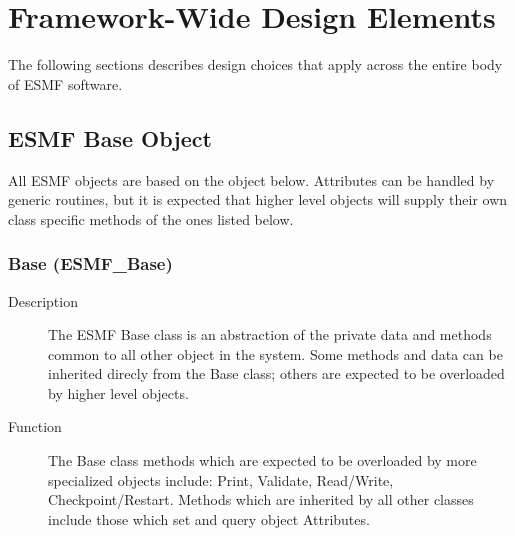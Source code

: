 \section{Framework-Wide Design Elements}
\label{sec:fwdesign}

The following sections describes design choices that apply across the 
entire body of ESMF software.

\subsection{ESMF Base Object}

All ESMF objects are based on the object below.  Attributes
can be handled by generic routines, but it is expected that 
higher level objects will supply their own class specific
methods of the ones listed below.


\subsubsection{Base (ESMF\_Base)}
\label{sec:Base} 
\begin{description}
\item [Description] The ESMF Base class is an abstraction of the private data and
methods common to all other object in the system.  Some methods and data can be
inherited direcly from the Base class; others are expected to be overloaded by
higher level objects.
\item [Function] The Base class methods which are expected to be overloaded by
more specialized objects include: Print, Validate, Read/Write, Checkpoint/Restart.
Methods which are inherited by all other classes include those which 
set and query object Attributes.
\end{description}








